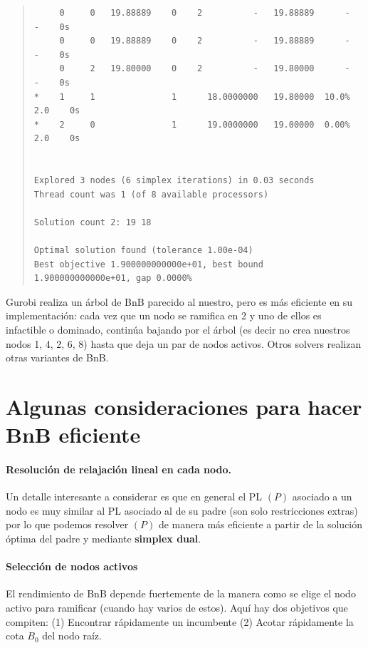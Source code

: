 \begin{quote}
\begin{lstlisting}
     0     0   19.88889    0    2          -   19.88889      -     -    0s
     0     0   19.88889    0    2          -   19.88889      -     -    0s
     0     2   19.80000    0    2          -   19.80000      -     -    0s
*    1     1               1      18.0000000   19.80000  10.0%   2.0    0s
*    2     0               1      19.0000000   19.00000  0.00%   2.0    0s


Explored 3 nodes (6 simplex iterations) in 0.03 seconds
Thread count was 1 (of 8 available processors)

Solution count 2: 19 18

Optimal solution found (tolerance 1.00e-04)
Best objective 1.900000000000e+01, best bound 1.900000000000e+01, gap 0.0000%
		\end{lstlisting}
    	\end{quote}
    
   Gurobi realiza un árbol de BnB parecido al nuestro, pero es más eficiente en su implementación: cada vez que un nodo se ramifica en 2 y uno de ellos es infactible o dominado, continúa bajando por el árbol (es decir no crea nuestros nodos 1, 4, 2, 6, 8) hasta que deja un par de nodos activos. Otros solvers realizan otras variantes de BnB.
   
    
    
    \section{Algunas consideraciones para hacer BnB eficiente}
    
    \paragraph{Resolución de relajación lineal en cada nodo.}
    Un detalle interesante a considerar es que en general el PL $(P)$ asociado a un nodo es muy similar al PL asociado al de su padre (son solo restricciones extras) por lo que podemos resolver $(P)$ de manera más eficiente a partir de la solución óptima del padre y mediante \textbf{simplex dual}.
    
    \paragraph{Selección de nodos activos}
    El rendimiento de BnB depende fuertemente de la manera como se elige el nodo activo para ramificar (cuando hay varios de estos). Aquí hay dos objetivos que compiten: (1) Encontrar rápidamente un incumbente (2) Acotar rápidamente la cota $B_0$ del nodo raíz.
    
